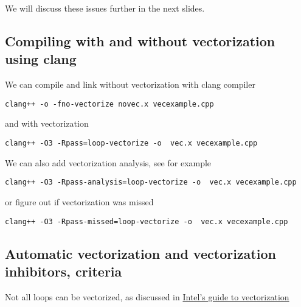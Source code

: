 \documentclass[%
oneside,                 %
final,                   %
10pt]{article}
\begin{document}
We will discuss these issues further in the next slides.  

\subsection*{Compiling with and without vectorization using clang}
We can compile and link without vectorization with clang compiler


\begin{verbatim}
clang++ -o -fno-vectorize novec.x vecexample.cpp

\end{verbatim}

and with vectorization


\begin{verbatim}
clang++ -O3 -Rpass=loop-vectorize -o  vec.x vecexample.cpp 

\end{verbatim}

We can also add vectorization analysis, see for example


\begin{verbatim}
clang++ -O3 -Rpass-analysis=loop-vectorize -o  vec.x vecexample.cpp 

\end{verbatim}

or figure out if vectorization was missed


\begin{verbatim}
clang++ -O3 -Rpass-missed=loop-vectorize -o  vec.x vecexample.cpp 

\end{verbatim}


\subsection*{Automatic vectorization and vectorization inhibitors, criteria}

Not all loops can be vectorized, as discussed in \href{{https://software.intel.com/en-us/articles/a-guide-to-auto-vectorization-with-intel-c-compilers}}{Intel's guide to vectorization}
\end{document}
